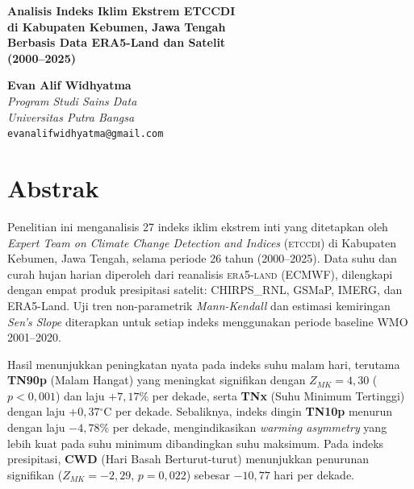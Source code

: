 \documentclass[12pt, a4paper]{article}
\newcommand{\degC}{$^{\circ}$C}
\begin{document}
\begin{titlepage}
  \centering
  \vspace*{1.5cm}
  {\Large\bfseries\color{headerblue}
    Analisis Indeks Iklim Ekstrem {ETCCDI}\\[0.4em]
    di Kabupaten Kebumen, Jawa Tengah\\[0.4em]
    Berbasis Data {ERA5-Land} dan Satelit\\
    (2000--2025)
  }
  \vspace{1.5cm}
  \vspace{0.8cm}

  {\large
    \textbf{Evan Alif Widhyatma}\\[0.3em]
    \textit{Program Studi Sains Data}\\[0.2em]
    \textit{Universitas Putra Bangsa}\\[0.2em]
    \texttt{evanalifwidhyatma@gmail.com}
  }
\end{titlepage}

\tableofcontents
\listoffigures
\listoftables
\newpage

\section*{Abstrak}

Penelitian ini menganalisis 27 indeks iklim ekstrem inti yang ditetapkan oleh \textit{Expert Team on Climate Change Detection and Indices} (\textsc{etccdi}) di Kabupaten Kebumen, Jawa Tengah, selama periode 26 tahun (2000--2025). Data suhu dan curah hujan harian diperoleh dari reanalisis \textsc{era5-land} (ECMWF), dilengkapi dengan empat produk presipitasi satelit: CHIRPS\_RNL, GSMaP, IMERG, dan ERA5-Land. Uji tren non-parametrik \textit{Mann-Kendall} dan estimasi kemiringan \textit{Sen's Slope} diterapkan untuk setiap indeks menggunakan periode baseline WMO 2001--2020.

Hasil menunjukkan peningkatan nyata pada indeks suhu malam hari, terutama \textbf{TN90p} (Malam Hangat) yang meningkat signifikan dengan $Z_{MK} = 4{,}30$ ($p < 0{,}001$) dan laju $+7{,}17\%$ per dekade, serta \textbf{TNx} (Suhu Minimum Tertinggi) dengan laju $+0{,}37$\degC{} per dekade. Sebaliknya, indeks dingin \textbf{TN10p} menurun dengan laju $-4{,}78\%$ per dekade, mengindikasikan \textit{warming asymmetry} yang lebih kuat pada suhu minimum dibandingkan suhu maksimum. Pada indeks presipitasi, \textbf{CWD} (Hari Basah Berturut-turut) menunjukkan penurunan signifikan ($Z_{MK} = -2{,}29$, $p = 0{,}022$) sebesar $-10{,}77$ hari per dekade.
\end{document}

